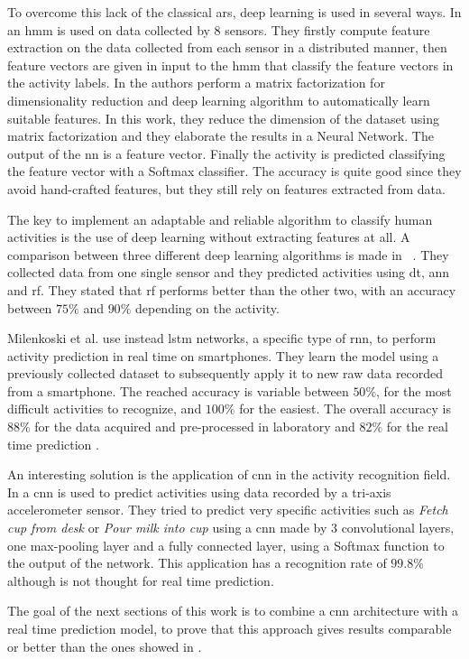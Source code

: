To overcome this lack of the classical \gls{ars}, deep learning is used in several ways.
In \cite{Guenterberg09} an \gls{hmm} is used on data collected by 8 sensors. They firstly compute feature extraction on the data collected from each sensor in a distributed manner, then feature vectors are given in input to the \gls{hmm} that classify the feature vectors in the activity labels.
In \cite{Chikhaoui17} the authors perform a matrix factorization for dimensionality reduction and deep learning algorithm to automatically learn suitable features.
In this work, they reduce the dimension of the dataset using matrix factorization and they elaborate the results in a Neural Network. The output of the \gls{nn} is a feature vector. Finally the activity is predicted classifying the feature vector with a Softmax classifier.
The accuracy is quite good since they avoid hand-crafted features, but they still rely on features extracted from data.

The key to implement an adaptable and reliable algorithm to classify human activities is the use of deep learning without extracting features at all.
A comparison between three different deep learning algorithms is made in ~\cite{Xu2017}. They collected data from one single sensor and they predicted activities using \gls{dt}, \gls{ann} and \gls{rf}. They stated that \gls{rf} performs better than the other two, with an accuracy between $75 \%$ and $90 \%$ depending on the activity.

Milenkoski et al. use instead \gls{lstm} networks, a specific type of \gls{rnn}, to perform activity prediction in real time on smartphones.
They learn the model using a previously collected dataset to subsequently apply it to new raw data recorded from a smartphone. The reached accuracy is variable between $50\%$, for the most difficult activities to recognize, and $100\%$ for the easiest. The overall accuracy is $88\%$ for the data acquired and pre-processed in laboratory and $82\%$ for the real time prediction \cite{Milenkoski18}.

An interesting solution is the application of \gls{cnn} in the activity recognition field.
In \cite{Panwar17} a \gls{cnn} is used to predict activities using data recorded by a tri-axis accelerometer sensor. They tried to predict very specific activities such as \textit{Fetch cup from desk} or \textit{Pour milk into cup} using a \gls{cnn} made by 3 convolutional layers, one max-pooling layer and a fully connected layer, using a Softmax function to the output of the network.
This application has a recognition rate of $99.8\%$ although is not thought for real time prediction.

The goal of the next sections of this work is to combine a \gls{cnn} architecture with a real time prediction model, to prove that this approach gives results comparable or better than the ones showed in \cite{Korbinian}.